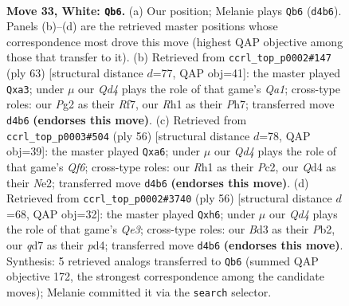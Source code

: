 \documentclass[11pt]{article}
\begin{document}
\clearpage

\begin{figure}[p]\centering
\begin{subfigure}{0.46\textwidth}\centering
\resizebox{\linewidth}{!}{%
\newchessgame
\chessboard[
  setfen={4k1nr/1b1q4/8/r3PN2/3Q3p/1p1B3P/6P1/2R3KR w - - 1 33},
  showmover=false,
  pgfstyle=straightmove, color=movearrow, markmove={d4-b6}
]}
\caption{}
\end{subfigure}\hfill
\begin{subfigure}{0.46\textwidth}\centering
\resizebox{\linewidth}{!}{%
\newchessgame
\chessboard[
  setfen={q5k1/2n1brpp/3p4/2p2P2/2P1N3/R5BP/4Q3/3R2K1 b - - 0 32},
  showmover=false,
  pgfstyle=straightmove, color=movearrow, markmove={a8-a3}
]}
\caption{}
\end{subfigure}
\\[4pt]
\begin{subfigure}{0.46\textwidth}\centering
\resizebox{\linewidth}{!}{%
\newchessgame
\chessboard[
  setfen={1k3r2/3B4/p4Q2/2q5/1p6/4bb2/PPP1N3/1K1R4 w - - 2 29},
  showmover=false,
  pgfstyle=straightmove, color=movearrow, markmove={f6-a6}
]}
\caption{}
\end{subfigure}\hfill
\begin{subfigure}{0.46\textwidth}\centering
\resizebox{\linewidth}{!}{%
\newchessgame
\chessboard[
  setfen={4r1k1/3q4/p1b4p/4P3/3p2P1/2N1Q2P/1P6/5RK1 w - - 0 29},
  showmover=false,
  pgfstyle=straightmove, color=movearrow, markmove={e3-h6}
]}
\caption{}
\end{subfigure}
\caption{\textbf{Move 33, White: \texttt{Qb6}.} (a) Our position; Melanie plays \texttt{Qb6} (\texttt{d4b6}). Panels (b)--(d) are the retrieved master positions whose correspondence most drove this move (highest QAP objective among those that transfer to it). (b) Retrieved from \texttt{ccrl\_top\_p0002\#147} (ply 63) [structural distance $d$=77, QAP obj=41]: the master played \texttt{Qxa3}; under $\mu$ our \emph{Qd4} plays the role of that game's \emph{Qa1}; cross-type roles: our \emph{P}g2 as their \emph{R}f7, our \emph{R}h1 as their \emph{P}h7; transferred move \texttt{d4b6} \textbf{(endorses this move)}. (c) Retrieved from \texttt{ccrl\_top\_p0003\#504} (ply 56) [structural distance $d$=78, QAP obj=39]: the master played \texttt{Qxa6}; under $\mu$ our \emph{Qd4} plays the role of that game's \emph{Qf6}; cross-type roles: our \emph{R}h1 as their \emph{P}c2, our \emph{Q}d4 as their \emph{N}e2; transferred move \texttt{d4b6} \textbf{(endorses this move)}. (d) Retrieved from \texttt{ccrl\_top\_p0002\#3740} (ply 56) [structural distance $d$=68, QAP obj=32]: the master played \texttt{Qxh6}; under $\mu$ our \emph{Qd4} plays the role of that game's \emph{Qe3}; cross-type roles: our \emph{B}d3 as their \emph{P}b2, our \emph{q}d7 as their \emph{p}d4; transferred move \texttt{d4b6} \textbf{(endorses this move)}. Synthesis: 5 retrieved analogs transferred to \texttt{Qb6} (summed QAP objective 172, the strongest correspondence among the candidate moves); Melanie committed it via the \texttt{search} selector.}
\label{fig:thought-m64}
\end{figure}
\end{document}
